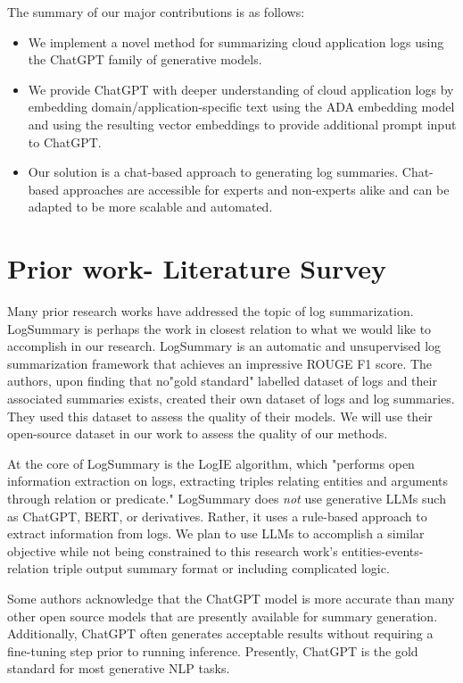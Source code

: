 \documentclass[conference]{IEEEtran}
\begin{document}
The summary of our major contributions is as follows:

\begin{itemize}
    \item We implement a novel method for summarizing cloud application logs using the ChatGPT family of generative models.
    \item We provide ChatGPT with deeper understanding of cloud application logs by embedding domain/application-specific text using the ADA embedding model and using the resulting vector embeddings to provide additional prompt input to ChatGPT.
    \item Our solution is a chat-based approach to generating log summaries. Chat-based approaches are accessible for experts and non-experts alike and can be adapted to be more scalable and automated.
\end{itemize}

\section{Prior work- Literature Survey}

Many prior research works have addressed the topic of log summarization. LogSummary \cite{10017337} is perhaps the work in closest relation to what we would like to accomplish in our research. LogSummary is an automatic and unsupervised log summarization framework that achieves an impressive ROUGE F1 score. The authors, upon finding that no"gold standard" labelled dataset of logs and their associated summaries exists, created their own dataset of logs and log summaries. They used this dataset to assess the quality of their models. We will use their open-source dataset in our work to assess the quality of our methods.

At the core of LogSummary is the LogIE algorithm, which "performs open information extraction on logs, extracting triples relating entities and arguments through relation or predicate." \cite{10017337} LogSummary does \textit{not} use generative LLMs such as ChatGPT, BERT, or derivatives. Rather, it uses a rule-based approach to extract information from logs. We plan to use LLMs to accomplish a similar objective while not being constrained to this research work's entities-events-relation triple output summary format or including complicated logic.

Some authors acknowledge that the ChatGPT model is more accurate than many other open source models that are presently available for summary generation. Additionally, ChatGPT often generates acceptable results without requiring a fine-tuning step prior to running inference. Presently, ChatGPT is the gold standard for most generative NLP tasks.\cite{bendimerad2023onpremise}
\end{document}
